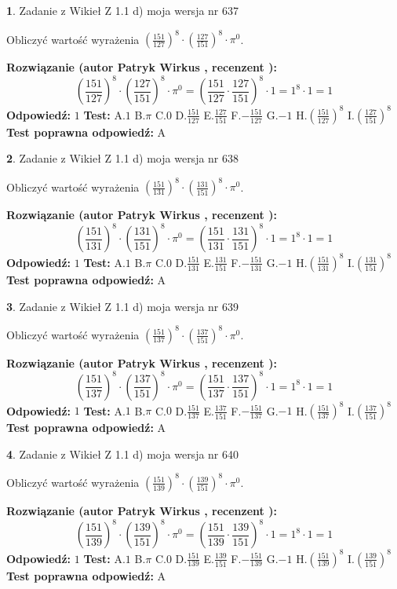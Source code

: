 \documentclass[12pt, a4paper]{article}
\theoremstyle{definition} %
\newtheorem{zad}{}
\newcommand{\zadStart}[1]{\begin{zad}#1\newline}
\newcommand{\zadStop}{\end{zad}}
\newcommand{\rozwStart}[2]{\noindent \textbf{Rozwiązanie (autor #1 , recenzent #2): }\newline}
\newcommand{\rozwStop}{\newline}
\newcommand{\odpStart}{\noindent \textbf{Odpowiedź:}\newline}
\newcommand{\odpStop}{\newline}
\newcommand{\testStart}{\noindent \textbf{Test:}\newline}
\newcommand{\testStop}{\newline}
\newcommand{\kluczStart}{\noindent \textbf{Test poprawna odpowiedź:}\newline}
\newcommand{\kluczStop}{\newline}
\begin{document}
\zadStart{Zadanie z Wikieł Z 1.1 d) moja wersja nr 637}

Obliczyć wartość wyrażenia $(\frac{151}{127})^{8} \cdot (\frac{127}{151})^{8} \cdot \pi^{0}$.
\zadStop
\rozwStart{Patryk Wirkus}{}
$$(\frac{151}{127})^{8} \cdot (\frac{127}{151})^{8} \cdot \pi^{0} = (\frac{151}{127} \cdot \frac{127}{151})^{8} \cdot 1 = 1^{8} \cdot 1 = 1$$
\rozwStop
\odpStart
$1$
\odpStop
\testStart
A.$1$ B.$\pi$ C.$0$ D.$\frac{151}{127}$ E.$\frac{127}{151}$
F.$-\frac{151}{127}$ G.$-1$
H.$(\frac{151}{127})^{8}$
I.$(\frac{127}{151})^{8}$
\testStop
\kluczStart
A
\kluczStop



\zadStart{Zadanie z Wikieł Z 1.1 d) moja wersja nr 638}

Obliczyć wartość wyrażenia $(\frac{151}{131})^{8} \cdot (\frac{131}{151})^{8} \cdot \pi^{0}$.
\zadStop
\rozwStart{Patryk Wirkus}{}
$$(\frac{151}{131})^{8} \cdot (\frac{131}{151})^{8} \cdot \pi^{0} = (\frac{151}{131} \cdot \frac{131}{151})^{8} \cdot 1 = 1^{8} \cdot 1 = 1$$
\rozwStop
\odpStart
$1$
\odpStop
\testStart
A.$1$ B.$\pi$ C.$0$ D.$\frac{151}{131}$ E.$\frac{131}{151}$
F.$-\frac{151}{131}$ G.$-1$
H.$(\frac{151}{131})^{8}$
I.$(\frac{131}{151})^{8}$
\testStop
\kluczStart
A
\kluczStop



\zadStart{Zadanie z Wikieł Z 1.1 d) moja wersja nr 639}

Obliczyć wartość wyrażenia $(\frac{151}{137})^{8} \cdot (\frac{137}{151})^{8} \cdot \pi^{0}$.
\zadStop
\rozwStart{Patryk Wirkus}{}
$$(\frac{151}{137})^{8} \cdot (\frac{137}{151})^{8} \cdot \pi^{0} = (\frac{151}{137} \cdot \frac{137}{151})^{8} \cdot 1 = 1^{8} \cdot 1 = 1$$
\rozwStop
\odpStart
$1$
\odpStop
\testStart
A.$1$ B.$\pi$ C.$0$ D.$\frac{151}{137}$ E.$\frac{137}{151}$
F.$-\frac{151}{137}$ G.$-1$
H.$(\frac{151}{137})^{8}$
I.$(\frac{137}{151})^{8}$
\testStop
\kluczStart
A
\kluczStop



\zadStart{Zadanie z Wikieł Z 1.1 d) moja wersja nr 640}

Obliczyć wartość wyrażenia $(\frac{151}{139})^{8} \cdot (\frac{139}{151})^{8} \cdot \pi^{0}$.
\zadStop
\rozwStart{Patryk Wirkus}{}
$$(\frac{151}{139})^{8} \cdot (\frac{139}{151})^{8} \cdot \pi^{0} = (\frac{151}{139} \cdot \frac{139}{151})^{8} \cdot 1 = 1^{8} \cdot 1 = 1$$
\rozwStop
\odpStart
$1$
\odpStop
\testStart
A.$1$ B.$\pi$ C.$0$ D.$\frac{151}{139}$ E.$\frac{139}{151}$
F.$-\frac{151}{139}$ G.$-1$
H.$(\frac{151}{139})^{8}$
I.$(\frac{139}{151})^{8}$
\testStop
\kluczStart
A
\kluczStop
\end{document}
